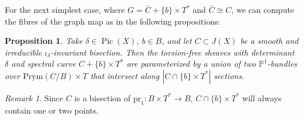 \documentclass{article}[12pt]
\newtheorem{proposition}[theorem]{Proposition}
\theoremstyle{definition}
\theoremstyle{remark}
\newtheorem{remark}[theorem]{Remark}
\numberwithin{equation}{section}
\newcommand \mb{\mathbb}
\DeclareMathOperator{\Pic}{Pic}
\begin{document}
For the next simplest case, where $G=\overline{C}+\{b\}\times T^*$ and $\overline{C}\cong C$, we can compute the fibres of the graph map as in the following propositions:
\begin{proposition}\label{singular}
	Take $\delta \in \Pic(X)$, $b \in B$, and let $C\subset J(X)$ be a smooth and irreducible $\iota_\delta$-invariant bisection. Then the torsion-free sheaves with determinant $\delta$ and spectral curve $C+\{b\}\times T^*$ are parameterized by a union of two $\mb{P}^1$-bundles over $\text{Prym}(C/B)\times T$ that intersect along $|C\cap \{b\}\times T^*|$ sections.
\end{proposition}
\begin{remark}
	Since $C$ is a bisection of $\text{pr}_1:B\times T^*\to B$, $C\cap \{b\}\times T^*$ will always contain one or two points.
\end{remark}
\end{document}
